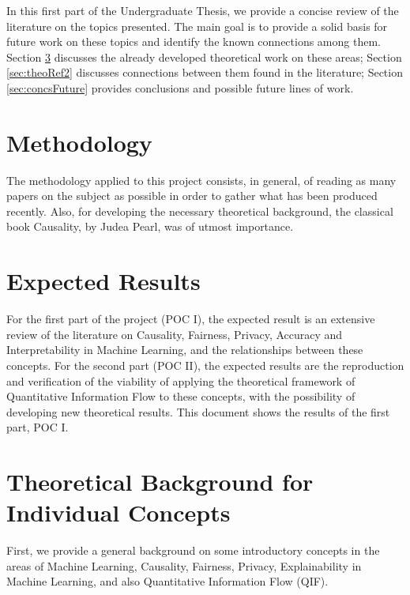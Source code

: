 \documentclass{article}
\begin{document}
In this first part of the Undergraduate Thesis, we provide a concise review of the literature on the topics presented. The main goal is to provide a solid basis for future work on these topics and identify the known connections among them. Section \ref{sec:theoRef1} discusses the already developed theoretical work on these areas; Section \ref{sec:theoRef2} discusses connections between them found in the literature; Section \ref{sec:concsFuture} provides conclusions and possible future lines of work. 

\section{Methodology}

The methodology applied to this project consists, in general, of reading as many papers on the subject as possible in order to gather what has been produced recently. Also, for developing the necessary theoretical background, the classical book Causality\cite{Causality}, by Judea Pearl, was of utmost importance.

\section{Expected Results}

For the first part of the project (POC I), the expected result is an extensive review of the literature on Causality, Fairness, Privacy, Accuracy and Interpretability in Machine Learning, and the relationships between these concepts. For the second part (POC II), the expected results are the reproduction and verification of the viability of applying the theoretical framework of Quantitative Information Flow to these concepts, with the possibility of developing new theoretical results. This document shows the results of the first part, POC I.

\section{Theoretical Background for Individual Concepts}\label{sec:theoRef1}

First, we provide a general background on some introductory concepts in the areas of Machine Learning, Causality, Fairness, Privacy, Explainability in Machine Learning, and also Quantitative Information Flow (QIF).


\end{document}
